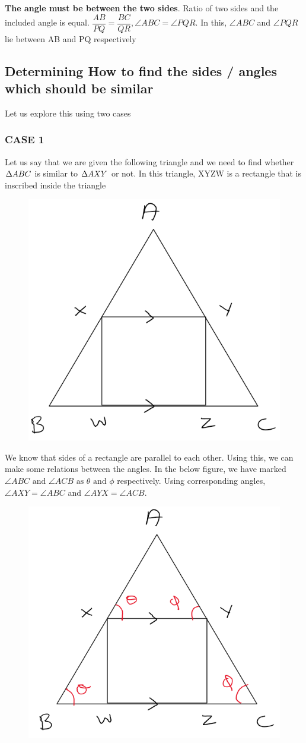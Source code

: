\textbf{The angle must be between the two sides}. Ratio of two sides and the included angle is equal. $\dfrac{AB}{PQ} = \dfrac{BC}{QR}, \angle ABC = \angle PQR$. In this, $\angle ABC$ and $\angle PQR$ lie between AB and PQ respectively





\subsection{Determining How to find the sides / angles which should be similar}

Let us explore this using two cases

\subsubsection{CASE 1}

Let us say that we are given the following triangle and we need to find whether $\Delta {ABC}$ is similar to $\Delta {AXY}$ or not. In this triangle, XYZW is a rectangle that is inscribed inside the triangle

\begin{figure}[h!]
    \centering
    \includegraphics[width=0.5\linewidth]{Quant//Geometry//Images//Triangles/rodha_triangle_6_similarity_equation_case_1.png}
\end{figure}

We know that sides of a rectangle are parallel to each other. Using this, we can make some relations between the angles. In the below figure, we have marked $\angle{ABC} \text{ and } \angle{ACB} \text{ as } \theta \text{ and } \phi$ respectively. Using corresponding angles, $\angle{AXY} = \angle{ABC}$ and $\angle{AYX} = \angle{ACB}$. 

\begin{figure}
    \centering
    \includegraphics[width=0.5\linewidth]{Quant//Geometry//Images//Triangles/rodha_triangle_6_similarity_equation_case_1_2.png}
\end{figure}

